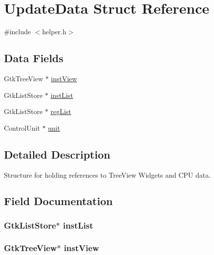 \hypertarget{struct_update_data}{}\section{Update\+Data Struct Reference}
\label{struct_update_data}


{\ttfamily \#include $<$helper.\+h$>$}

\subsection*{Data Fields}
\begin{DoxyCompactItemize}
\item 
Gtk\+Tree\+View $\ast$ \hyperlink{struct_update_data_ac0dd0f7489c2628ffd5e94e3ea3727d3}{inst\+View}
\item 
Gtk\+List\+Store $\ast$ \hyperlink{struct_update_data_a68c5a7482deacde6700ee117dd7d09bb}{inst\+List}
\item 
Gtk\+List\+Store $\ast$ \hyperlink{struct_update_data_ab346f7795b5d9c7037de31b61c54f917}{reg\+List}
\item 
Control\+Unit $\ast$ \hyperlink{struct_update_data_aef46f952d07fd9f4be393243758f7f81}{unit}
\end{DoxyCompactItemize}


\subsection{Detailed Description}
Structure for holding references to Tree\+View Widgets and C\+PU data. 

\subsection{Field Documentation}
\subsubsection[{\texorpdfstring{inst\+List}{instList}}]{\setlength{\rightskip}{0pt plus 5cm}Gtk\+List\+Store$\ast$ inst\+List}\hypertarget{struct_update_data_a68c5a7482deacde6700ee117dd7d09bb}{}\label{struct_update_data_a68c5a7482deacde6700ee117dd7d09bb}
\subsubsection[{\texorpdfstring{inst\+View}{instView}}]{\setlength{\rightskip}{0pt plus 5cm}Gtk\+Tree\+View$\ast$ inst\+View}\hypertarget{struct_update_data_ac0dd0f7489c2628ffd5e94e3ea3727d3}{}\label{struct_update_data_ac0dd0f7489c2628ffd5e94e3ea3727d3}

